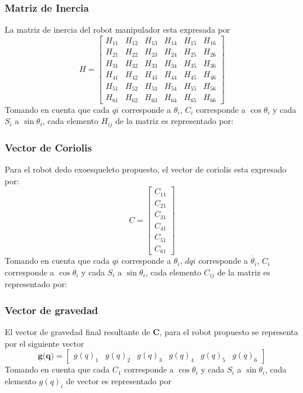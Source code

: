 \documentclass[journal]{IEEEtran}
\begin{document}
    \subsubsection{Matriz de Inercia}
    La matriz de inercia del robot manipulador esta expresada por 
    \begin{equation*}
        H=\begin{bmatrix} H_{11} & H_{12} & H_{13} & H_{14} & H_15 & H_{16}\\
        H_{21} & H_{22} & H_{23} & H_{24} & H_25 & H_{26}\\
        H_{31} & H_{32} & H_{33} & H_{34} & H_35 & H_{36}\\
        H_{41} & H_{42} & H_{43} & H_{44} & H_45 & H_{46}\\
        H_{51} & H_{52} & H_{53} & H_{54} & H_55 & H_{56}\\
        H_{61} & H_{62} & H_{63} & H_{64} & H_65 & H_{66}
    \end{bmatrix}
    \end{equation*}
    \noindent Tomando en cuenta que cada $qi$ corresponde a $\theta_i$, $C_i$ corresponde a $\cos \theta_i$ y cada $S_i$ a
    $\sin \theta_i$, cada elemento $H_{ij}$ de la matriz es representado por:

    \subsubsection{Vector de Coriolis}
    Para el robot dedo exoesqueleto propuesto, el vector de coriolis esta expresado por:
    \begin{equation*}
        C=\begin{bmatrix} C_{11}\\
                        C_{21}\\
                        C_{31}\\
                        C_{41}\\
                        C_{51}\\
                        C_{61}\end{bmatrix}
    \end{equation*}
    \noindent Tomando en cuenta que cada $qi$ corresponde a $\theta_i$, $dqi$ corresponde a $\dot{\theta_i}$, $C_i$ corresponde
    a $\cos \theta_i$ y cada $S_i$ a $\sin \theta_i$, cada elemento $C_{ij}$ de la matriz es representado por:


    \subsubsection{Vector de gravedad}
    El vector de gravedad final resultante de $\textbf{C}$, para el robot propuesto se representa por el siguiente vector
    \begin{equation*}
        \textbf{g(q)}= \begin{bmatrix} g(q)_1 & g(q)_2 & g(q)_3 & g(q)_4 &g(q)_5 & g(q)_6  \end{bmatrix}
    \end{equation*}
    Tomando en cuenta que cada $C_1$ corresponde a $\cos \theta_i$ y cada $S_i$ a $\sin \theta_i$, cada  elemento $g(q)_i$ de
    vector es representado por 
\end{document}

